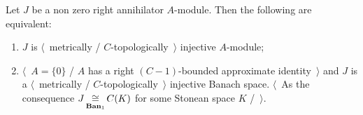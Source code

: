 \begin{proposition}\label{MetTopInjOfAnnihModCharac} Let $J$ be a non zero right
annihilator $A$-module. Then the following are equivalent:

\begin{enumerate}[label = (\roman*)]
    \item $J$ is $\langle$~metrically / $C$-topologically~$\rangle$ injective
    $A$-module;

    \item $\langle$~$A= \{0 \}$ / $A$ has a right $(C-1)$-bounded approximate
    identity~$\rangle$ and $J$ is a $\langle$~metrically /
    $C$-topologically~$\rangle$ injective Banach space. $\langle$~As the
    consequence $J\mathop{\mathbin{\cong}}\limits_{\mathbf{Ban}_1}C(K)$ for some Stonean space $K$
    /~$\rangle$.
\end{enumerate}
\end{proposition}
